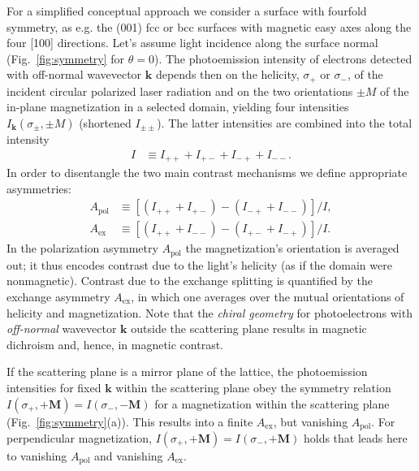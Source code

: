 \documentclass[prl,twocolumn,floatfix]{revtex4-2}
\renewcommand{\vec}[1]{\boldsymbol{#1}}
\begin{document}
For a simplified conceptual approach we consider a surface with fourfold symmetry, as e.g. the (001) fcc or bcc surfaces with magnetic easy axes along the four [100] directions. Let's assume light incidence along the surface normal (Fig.~\ref{fig:symmetry} for $\theta=0$). The photoemission intensity of electrons detected with off-normal wavevector $\vec{k}$ depends then on the helicity, $\sigma_{+}$ or $\sigma_{-}$, of the incident circular polarized laser radiation and on the two orientations $\pm M$ of the in-plane magnetization in a selected domain, yielding four intensities $I_{\vec{k}}(\sigma_{\pm}, \pm M)$ (shortened $I_{\pm \pm}$). The latter intensities are combined into the total intensity
\begin{align}
    I & \equiv I_{+ +} + I_{+ -} + I_{- +} + I_{- -}. 
\end{align}
In order to disentangle the two main contrast mechanisms we define appropriate asymmetries:
\begin{subequations}
\begin{align}
    A_{\mathrm{pol}} & \equiv \left[ \left( I_{+ +} + I_{+ -} \right) - \left( I_{- +} + I_{- -} \right) \right] / I,
    \label{eq:Apol}
    \\
    A_{\mathrm{ex}} & \equiv \left[ \left( I_{+ +} + I_{- -} \right) - \left( I_{+ -} + I_{- +} \right) \right] / I.
    \label{eq:Aex}
\end{align}    
\end{subequations}
In the polarization asymmetry $A_{\mathrm{pol}}$ the magnetization's orientation is averaged out; it thus encodes contrast due to the light's helicity (as if the domain were nonmagnetic). Contrast due to the exchange splitting is quantified by the exchange asymmetry $A_{\mathrm{ex}}$, in which one averages over the mutual orientations of helicity and magnetization. Note that the \textit{chiral geometry} for photoelectrons with \textit{off-normal} wavevector $\vec{k}$ outside the scattering plane results in magnetic dichroism and, hence, in magnetic contrast.


If the scattering plane is a mirror plane of the lattice, the photoemission intensities for fixed $\vec{k}$ within the scattering plane obey the symmetry relation $I(\sigma_{+}, +\vec{M}) = I(\sigma_{-}, -\vec{M})$ for a magnetization within the scattering plane (Fig.~\ref{fig:symmetry}(a)). This results into a finite $A_{\mathrm{ex}}$, but vanishing $A_{\mathrm{pol}}$. For perpendicular magnetization, $I(\sigma_{+}, +\vec{M}) = I(\sigma_{-}, +\vec{M})$ holds that leads here to vanishing $A_{\mathrm{pol}}$ and vanishing $A_{\mathrm{ex}}$.
\end{document}
